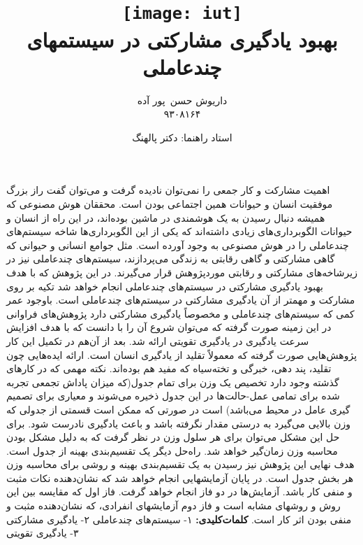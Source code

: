 \documentclass[12pt,a4paper]{article}
\begin{document}
\title{
    \texttt{[image: iut]}\\\vspace{20pt}
    بهبود یادگیری مشارکتی در سیستمهای چندعاملی\\
}
\author{
داریوش حسن\ پور آده\\
۹۳۰۸۱۶۴
}
\date{استاد راهنما: دکتر پالهنگ}
\maketitle

اهمیت مشارکت و کار جمعی را نمی‌توان نادیده گرفت و می‌توان گفت راز بزرگ موفقیت انسان و حیوانات همین اجتماعی
بودن است. محققان هوش مصنوعی که همیشه دنبال رسیدن به یک هوشمندی در ماشین بوده‌اند، در این راه از انسان و حیوانات
الگوبرداری‌های زیادی داشته‌اند که یکی از این الگوبرداری‌ها شاخه سیستم‌های چندعاملی را در هوش مصنوعی به وجود آورده
است. مثل جوامع انسانی و حیوانی که گاهی مشارکتی و گاهی رقابتی به زندگی می‌پردازند، سیستم‌های چندعاملی نیز در
زیرشاخه‌های مشارکتی و رقابتی موردپژوهش قرار می‌گیرند. در این پژوهش که با هدف بهبود یادگیری مشارکتی در سیستم‌های
چندعاملی انجام خواهد شد تکیه‌ بر روی مشارکت و مهمتر از آن یادگیری مشارکتی در سیستم‌های چندعاملی است.
باوجود عمر کمی که سیستم‌های چندعاملی و مخصوصاً یادگیری مشارکتی دارد پژوهش‌های فراوانی در این زمینه صورت
گرفته که می‌توان شروع آن را با  دانست که با هدف افزایش سرعت یادگیری در یادگیری تقویتی ارائه شد. 
بعد از آن‌هم در تکمیل این کار پژوهش‌هایی صورت گرفته که معمولاً تقلید از یادگیری انسان است. ارائه ایده‌هایی چون تقلید، پند دهی، خبرگی
و تخته‌سیاه که مفید هم بوده‌اند. نکته مهمی که در کارهای گذشته وجود دارد تخصیص یک وزن برای تمام جدول(که میزان پاداش تجمعی تجربه شده برای تمامی عمل-حالت‌ها در این جدول ذخیره می‌شوند و معیاری برای تصمیم گیری عامل در محیط می‌باشد) است در صورتی که ممکن است قسمتی از جدولی که وزن بالایی می‌گیرد به درستی مقدار نگرفته باشد و باعث یادگیری نادرست شود. برای حل
این مشکل می‌توان برای هر سلول وزن در نظر گرفت که به دلیل مشکل بودن محاسبه وزن زمان‌گیر خواهد شد. راه‌حل دیگر یک
تقسیم‌بندی بهینه از جدول است. هدف نهایی این پژوهش نیز رسیدن به یک تقسیم‌بندی بهینه و روشی برای محاسبه وزن هر بخش
جدول است. در پایان آزمایشهایی انجام خواهد شد که نشان‌دهنده نکات مثبت و منفی کار باشد. آزمایش‌ها در دو فاز انجام خواهد
گرفت. فاز اول که مقایسه بین این روش و روشهای مشابه است و فاز دوم آزمایشهای انفرادی، که نشان‌دهنده مثبت و منفی بودن
اثر کار است.
\vspace{1em}
\noindent\textbf{کلمات‌کلیدی:} ۱- سیستم‌های چندعاملی ۲- یادگیری مشارکتی ۳- یادگیری تقویتی
\end{document}
